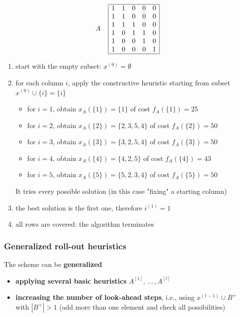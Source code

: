 \documentclass[11pt]{article}
\begin{document}
	$$
	A \;\;\;\;
	\begin{array}{| c c c c c |}
		\hline
		1 & 1 & 0 & 0 & 0 \\
		1 & 1 & 0 & 0 & 0 \\
 		1 & 1 & 1 & 0 & 0 \\
		1 & 0 & 1 & 1 & 0 \\
		1 & 0 & 0 & 1 & 0 \\
		1 & 0 & 0 & 0 & 1 \\
		\hline
	\end{array}
	$$
	
	\begin{enumerate}
		\item start with the empty subset: $x^{(0)} = \emptyset$
		
		\item for each column $i$, apply the constructive heuristic starting from subset $x^{(0)} \cup \{i\} = \{i\}$
		\begin{itemize}
			\item for $i = 1$, obtain $x_A (\{1\}) = \{1\}$ of cost $f_A (\{1\}) = 25$
			\item for $i = 2$, obtain $x_A (\{2\}) = \{2, 3, 5, 4\}$ of cost $f_A (\{2\}) = 50$
			\item for $i = 3$, obtain $x_A (\{3\}) = \{3, 2, 5, 4\}$ of cost $f_A (\{3\}) = 50$
			\item for $i = 4$, obtain $x_A (\{4\}) = \{4, 2, 5\}$ of cost $f_A (\{4\}) = 43$
			\item for $i = 5$, obtain $x_A (\{5\}) = \{5, 2, 3, 4\}$ of cost $f_A (\{5\}) = 50$
		\end{itemize}
		It tries every possible solution (in this case "fixing" a starting column)
		
		\item the best solution is the first one, therefore $i^{(1)} = 1$
		
		\item all rows are covered: the algorithm terminates
	\end{enumerate}
	
	\newpage
	
	\subsubsection{Generalized roll-out heuristics}
	The scheme can be \textbf{generalized}
	\begin{itemize}
		\item \textbf{applying several basic heuristics} $A^{[1]}, \, ... \, , A^{[l]}$
		
		\item \textbf{increasing the number of look-ahead steps}, i.e., using $x^{(t−1)} \cup B^+$ with $|B^+| > 1$ (add more than one element and check all possibilities)
	\end{itemize}
	
\end{document}
